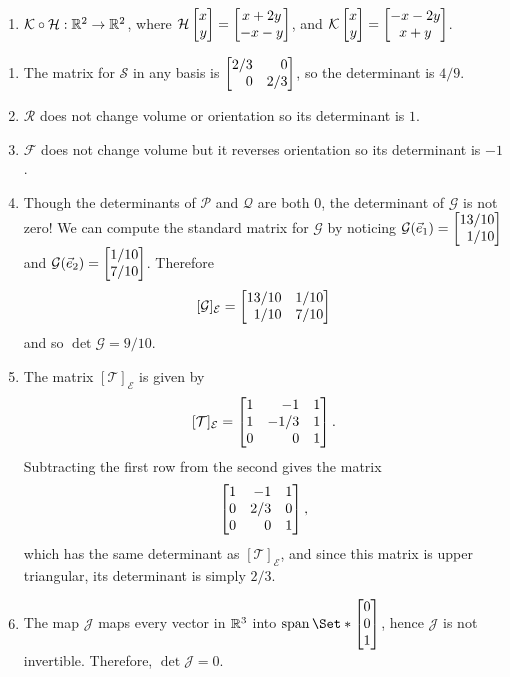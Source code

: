 \begin{exercises}
\begin{problist}
\begin{enumerate}
			\item $\mathcal{K}\circ \mathcal{H}:\mathbb{R}^{2}\to\mathbb{R}^{2}$, where
				$\mathcal{H}\mat{x\\y}=\matc{x+2y\\-x-y}$,
				and $\mathcal{K}\mat{x\\y}=\matc{-x-2y\\x+y}$.
		\end{enumerate}
		\begin{solution}
			\begin{enumerate}
				\item The matrix for $\mathcal S$ in any basis is $
					\mat{
						2/3 & 0 \\
						0 & 2/3
					}$, so the determinant is $4/9$.

				\item $\mathcal R$ does not change volume or orientation so its determinant is $1$.

				\item $\mathcal F$ does not change volume but it reverses orientation so its determinant
					is $-1$.
				
				\item Though the determinants of $\mathcal P$ and $\mathcal Q$ are both $0$, the determinant
					of $\mathcal G$ is not zero! We can compute the standard matrix for $\mathcal G$ by
					noticing $\mathcal G(\xhat)=\mat{13/10\\1/10}$ and $\mathcal G(\yhat)=\mat{1/10\\7/10}$.
					Therefore
					\[
						[\mathcal G]_{\mathcal E} =\mat{13/10&1/10\\1/10&7/10}
					\]
					and so $\det\mathcal G=9/10$.
				
				\item The matrix $[\mathcal T]_{\mathcal E}$ is given by
					\[
						[\mathcal T]_{\mathcal E} =
						\mat{
							1 & -1   & 1 \\
							1 & -1/3 & 1 \\
							0 & 0    & 1
						}.
					\] Subtracting the first row from the second gives the matrix
					\[
						\mat{
							1 & -1  & 1 \\
							0 & 2/3 & 0 \\
							0 & 0   & 1
						},
					\] which has the same determinant as $[\mathcal T]_{\mathcal E}$, and since this
					matrix is upper triangular, its determinant is simply $2/3$.

				\item The map $\mathcal J$ maps every vector in $\mathbb{R}^{3}$ into $\Span\Set*{\mat{
						0 \\
						0 \\
						1}}$, hence $\mathcal J$ is not invertible. Therefore,
					$\det \mathcal J = 0$.


\end{enumerate}
\end{solution}
\end{problist}
\end{exercises}
